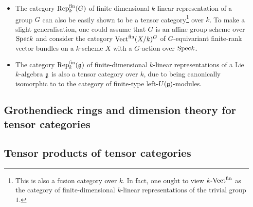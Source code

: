             \begin{example}
                \noindent
                \begin{itemize}
                    \item The category $\mathrm{Rep}_k^{\mathrm{fin}}(G)$ of finite-dimensional $k$-linear representation of a group $G$ can also be easily shown to be a tensor category\footnote{This is also a fusion category over $k$. In fact, one ought to view $k\text{-}\mathrm{Vect}^{\mathrm{fin}}$ as the category of finite-dimensional $k$-linear representations of the trivial group $1$.} over $k$. To make a slight generalisation, one could assume that $G$ is an affine group scheme over $\mathrm{Spec} k$ and consider the category $\mathrm{Vect}^{\mathrm{fin}}(X/k)^G$ of $G$-equivariant finite-rank vector bundles on a $k$-scheme $X$ with a $G$-action over $\mathrm{Spec} k$.
                    \item The category $\mathrm{Rep}_k^{\mathrm{fin}}(\mathfrak{g})$ of finite-dimensional $k$-linear representations of a Lie $k$-algebra $\mathfrak{g}$ is also a tensor category over $k$, due to being canonically isomorphic to to the category of finite-type left-$U(\mathfrak{g})$-modules. 
                \end{itemize}
            \end{example}
            
            
    
    \subsection{Grothendieck rings and dimension theory for tensor categories}
    
    \subsection{Tensor products of tensor categories}